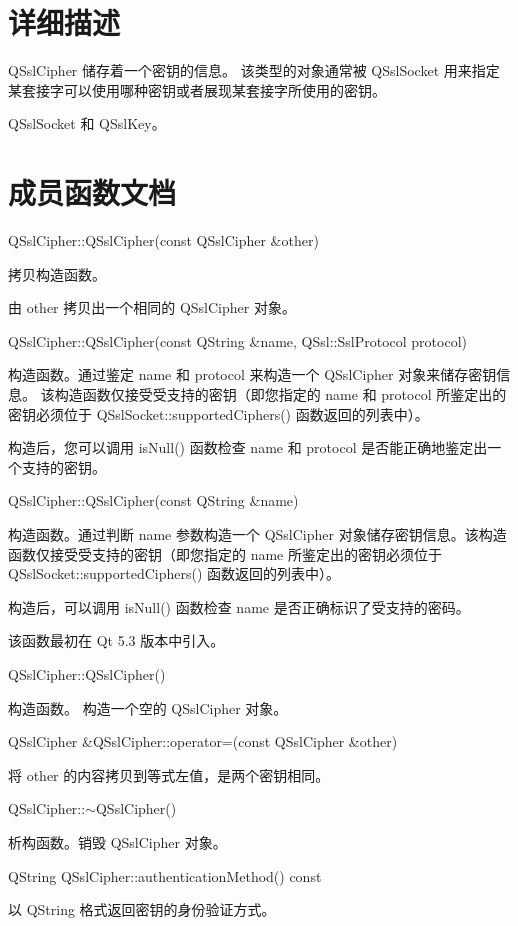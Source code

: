 \section{详细描述}

QSslCipher 储存着一个密钥的信息。
该类型的对象通常被 QSslSocket 
用来指定某套接字可以使用哪种密钥或者展现某套接字所使用的密钥。

\begin{seeAlso}
QSslSocket 和 QSslKey。
\end{seeAlso}

\section{成员函数文档}

QSslCipher::QSslCipher(const QSslCipher \&other)

拷贝构造函数。

由 other 拷贝出一个相同的 QSslCipher 对象。

QSslCipher::QSslCipher(const QString \&name, QSsl::SslProtocol protocol)

构造函数。通过鉴定 name 和 protocol 来构造一个 QSslCipher 对象来储存密钥信息。
该构造函数仅接受受支持的密钥（即您指定的 name 和 protocol 
所鉴定出的密钥必须位于 QSslSocket::supportedCiphers() 函数返回的列表中）。

构造后，您可以调用 isNull() 函数检查 name 和 protocol 是否能正确地鉴定出一个支持的密钥。

QSslCipher::QSslCipher(const QString \&name)

构造函数。通过判断 name 参数构造一个 QSslCipher 对象储存密钥信息。该构造函数仅接受受支持的密钥（即您指定的 name 所鉴定出的密钥必须位于 QSslSocket::supportedCiphers() 函数返回的列表中）。

构造后，可以调用 isNull() 函数检查 name 是否正确标识了受支持的密码。

该函数最初在 Qt 5.3 版本中引入。

QSslCipher::QSslCipher()

构造函数。
构造一个空的 QSslCipher 对象。

QSslCipher \&QSslCipher::operator=(const QSslCipher \&other)

将 other 的内容拷贝到等式左值，是两个密钥相同。

QSslCipher::$\sim$QSslCipher()

析构函数。销毁 QSslCipher 对象。

QString QSslCipher::authenticationMethod() const

以 QString 格式返回密钥的身份验证方式。

